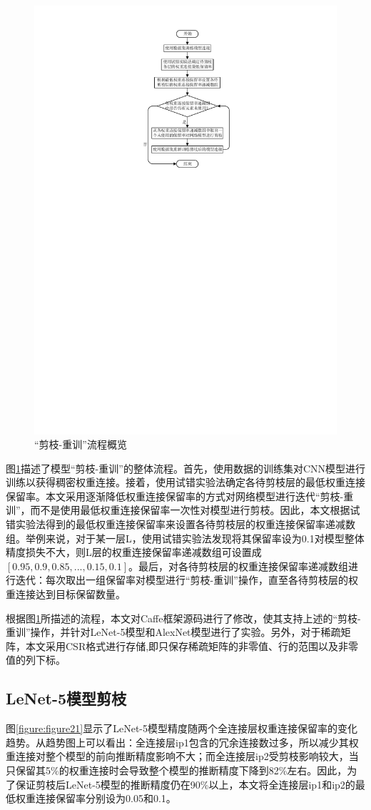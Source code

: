 \begin{figure}[htbp]
    \centering
    \includegraphics[height=0.8\textwidth]{figures/prune.pdf}
    \caption{“剪枝-重训”流程概览}\label{figure:figure20}
\end{figure}

图\ref{figure:figure20}描述了模型“剪枝-重训”的整体流程。首先，使用数据的训练集对CNN模型进行训练以获得稠密权重连接。接着，使用试错实验法确定各待剪枝层的最低权重连接保留率。本文采用逐渐降低权重连接保留率的方式对网络模型进行迭代“剪枝-重训”，而不是使用最低权重连接保留率一次性对模型进行剪枝。因此，本文根据试错实验法得到的最低权重连接保留率来设置各待剪枝层的权重连接保留率递减数组。举例来说，对于某一层L，使用试错实验法发现将其保留率设为0.1对模型整体精度损失不大，则L层的权重连接保留率递减数组可设置成$[0.95,0.9,0.85,...,0.15,0.1]$。最后，对各待剪枝层的权重连接保留率递减数组进行迭代：每次取出一组保留率对模型进行“剪枝-重训”操作，直至各待剪枝层的权重连接达到目标保留数量。

根据图\ref{figure:figure20}所描述的流程，本文对Caffe框架源码进行了修改，使其支持上述的“剪枝-重训”操作，并针对LeNet-5模型和AlexNet模型进行了实验。另外，对于稀疏矩阵，本文采用CSR格式进行存储,即只保存稀疏矩阵的非零值、行的范围以及非零值的列下标。

\subsection{LeNet-5模型剪枝}

图\ref{figure:figure21}显示了LeNet-5模型精度随两个全连接层权重连接保留率的变化趋势。从趋势图上可以看出：全连接层ip1包含的冗余连接数过多，所以减少其权重连接对整个模型的前向推断精度影响不大；而全连接层ip2受剪枝影响较大，当只保留其5\%的权重连接时会导致整个模型的推断精度下降到82\%左右。因此，为了保证剪枝后LeNet-5模型的推断精度仍在90\%以上，本文将全连接层ip1和ip2的最低权重连接保留率分别设为0.05和0.1。

